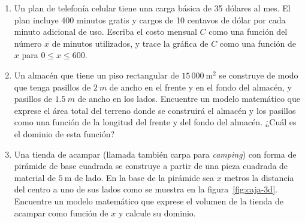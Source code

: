 \begin{prob}
\begin{enumerate}
\begin{figure}[!htbp]
\caption{Caja sin tapa: Hoja de cartón de $20 \times 12$ cm con cuadrados de lado $x$ recortados en las esquinas}
\label{fig:caja}
\end{figure}

\item Un plan de telefonía celular tiene una carga básica de 35 dólares al mes. El plan incluye 400 minutos gratis y cargos de 10 centavos de dólar por cada minuto adicional de uso. Escriba el costo mensual \(C\) como una función del número \(x\) de minutos utilizados, y trace la gráfica de \(C\) como una función de \(x\) para \(0 \leq x \leq 600\).



\item Un almacén que tiene un piso rectangular de \(15\,000\ \text{m}^2\) se construye de modo que tenga pasillos de \(2\ m\) de ancho en el frente y en el fondo del almacén, y pasillos de \(1.5\ m\) de ancho en los lados.  Encuentre un modelo matemático que exprese el área total del terreno donde se construirá el almacén y los pasillos como una función de la longitud del frente y del fondo del almacén.  ¿Cuál es el dominio de esta función?
 
\item Una tienda de acampar (llamada también carpa para \textit{camping}) con forma de pirámide de base cuadrada se construye a partir de una pieza cuadrada de material de $5\ \text{m}$ de lado. En la base de la pirámide sea $x$ metros la distancia del centro a uno de sus lados como se muestra en la figura~\ref{fig:caja-3d}.   Encuentre un modelo matemático que exprese el volumen de la tienda de acampar como función de $x$ y calcule su dominio.

\begin{figure}[!htbp]
\begin{center}
\end{center}
\end{figure}
\end{enumerate}
\end{prob}
